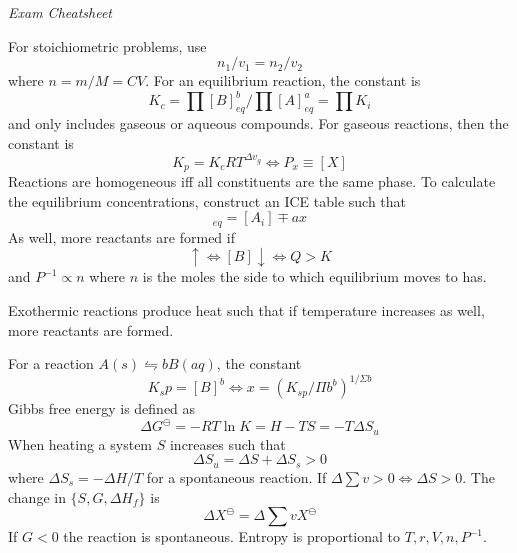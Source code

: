 \documentclass[11pt]{extarticle}
\begin{document}
\begin{multicols*}{2}
{\Large\textit{Exam Cheatsheet}}
\bigskip

For stoichiometric problems, use
\begin{equation}
  n_1/v_1 = n_2/v_2
\end{equation}
where $n = m/M = CV$. For an equilibrium reaction, the constant is
\begin{equation}
  K_c = \textstyle\prod [B]_{eq}^b / \textstyle\prod [A]_{eq}^a = \textstyle\prod K_i
\end{equation}
and only includes gaseous or aqueous compounds. For gaseous reactions, then the constant is
\begin{equation}
  K_p = K_c RT ^{\Delta v_g} \iff P_x \equiv [X]
\end{equation}
Reactions are homogeneous iff all constituents are the same phase. To calculate the equilibrium concentrations, construct an ICE table such that
\begin{equation}
  [X_i]_{eq} = [A_i] \mp ax
\end{equation}
As well, more reactants are formed if
\begin{equation}
  [A] \uparrow \iff [B] \downarrow \iff Q > K
\end{equation}
and $P^{-1} \propto n$ where $n$ is the moles the side to which equilibrium moves to has.

\bigskip
Exothermic reactions produce heat such that if temperature increases as well, more reactants are formed.

\bigskip
For a reaction $A(s) \leftrightharpoons bB(aq)$, the constant
\begin{equation}
  K_sp = [B]^b \iff x = (K_{sp}/\Pi b^b)^{1/\Sigma b}
\end{equation}
Gibbs free energy is defined as
\begin{equation}
  \Delta G^\ominus = -RT \ln K = H - TS = -T \Delta S_u
\end{equation}
When heating a system $S$ increases such that \begin{equation}
  \Delta S_u = \Delta S + \Delta S_s >0
\end{equation}
where $\Delta S_s = - \Delta H/T$ for a spontaneous reaction. If $\Delta \sum v > 0 \iff \Delta S > 0$. The change in $\{S,G,\Delta H_f\}$ is
\begin{equation}
  \Delta X^\ominus = \Delta \textstyle\sum v X^\ominus
\end{equation}
If $G < 0$ the reaction is spontaneous. Entropy is proportional to $T,r,V,n,P^{-1}$.


\end{multicols*}
\end{document}
